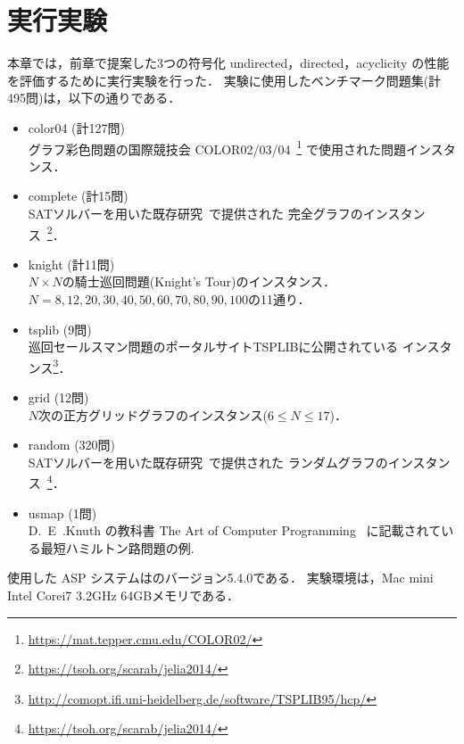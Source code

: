 \chapter{実行実験}\label{chap:experiment}

本章では，前章で提案した3つの符号化
\textsf{undirected}，\textsf{directed}，\textsf{acyclicity}
の性能を評価するために実行実験を行った．
%
実験に使用したベンチマーク問題集(計495問)は，以下の通りである．
\begin{itemize}
\item \textsf{color04} (計127問)\\
  グラフ彩色問題の国際競技会
  COLOR02/03/04~\footnote{\url{https://mat.tepper.cmu.edu/COLOR02/}}
  で使用された問題インスタンス．
\item \textsf{complete} (計15問)\\
  SATソルバーを用いた既存研究~\cite{soh14:jelia2014}で提供された
  完全グラフのインスタンス~\footnote{\url{https://tsoh.org/scarab/jelia2014/}}．
\item \textsf{knight} (計11問)\\
  $N\times N$の騎士巡回問題(Knight's Tour)のインスタンス．\\
  $N=8,12,20,30,40,50,60,70,80,90,100$の11通り．
\item \textsf{tsplib} (9問)\\
  巡回セールスマン問題のポータルサイトTSPLIBに公開されている
  インスタンス\footnote{\url{http://comopt.ifi.uni-heidelberg.de/software/TSPLIB95/hcp/}}．
\item \textsf{grid} (12問)\\
  $N$次の正方グリッドグラフのインスタンス($6\leq N\leq 17$)．
\item \textsf{random} (320問)\\
  SATソルバーを用いた既存研究~\cite{soh14:jelia2014}で提供された
  ランダムグラフのインスタンス~\footnote{\url{https://tsoh.org/scarab/jelia2014/}}．
\item \textsf{usmap} (1問)\\
  D.~E~.Knuth の教科書
  The Art of Computer Programming~\cite{Knuth:TAOCP:SAT}
  に記載されている最短ハミルトン路問題の例.
\end{itemize}

使用した ASP システムは{\clingo}のバージョン5.4.0である．
実験環境は，Mac mini Intel Corei7 3.2GHz 64GBメモリである．

